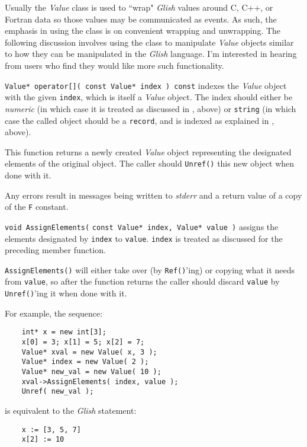 Usually the {\em Value} class is used to ``wrap" {\em Glish} values around
C, C++, or {\sc Fortran} data so those values may be communicated as
events.  As such, the emphasis in using the class is on convenient
wrapping and unwrapping.  The following discussion involves  using 
the class to
manipulate {\em Value} objects similar to how they can be manipulated
in the {\em Glish} language. I'm interested in hearing from users who
find they would like more such functionality.
\begin{sloppy}
\begin{list}{}{}

\item[{\tt Value* operator[]( const Value* index ) const}] indexes
the {\em Value} object with the given {\tt index}, which is itself
a {\em Value} object.  The index should either be {\em numeric} (in
which case it is treated as discussed in , above) or
{\tt string} (in which case the called object should be a {\tt record},
and is indexed as explained in , above).

This function returns a newly created {\em Value} object representing
the designated elements of the original object.  The caller should
{\tt Unref()} this new object when  done with it.

Any errors result in messages being written to {\em stderr} and
a return value of a copy of the {\tt F} constant.

\item[{\tt void AssignElements(}] {\tt const Value* index, Value* value )}
assigns the elements designated by {\tt index} to {\tt value}.  {\tt index}
is treated as discussed for the preceding member function.

{\tt AssignElements()} will either take over (by {\tt Ref()}'ing) or
copying what it needs from {\tt value}, so after the function returns
the caller should discard {\tt value} by {\tt Unref()}'ing it when 
done with it.

For example, the sequence:
\begin{verbatim}
    int* x = new int[3];
    x[0] = 3; x[1] = 5; x[2] = 7;
    Value* xval = new Value( x, 3 );
    Value* index = new Value( 2 );
    Value* new_val = new Value( 10 );
    xval->AssignElements( index, value );
    Unref( new_val );
\end{verbatim}
is equivalent to the {\em Glish} statement:
\begin{verbatim}
    x := [3, 5, 7]
    x[2] := 10
\end{verbatim}


\end{list}
\end{sloppy}
